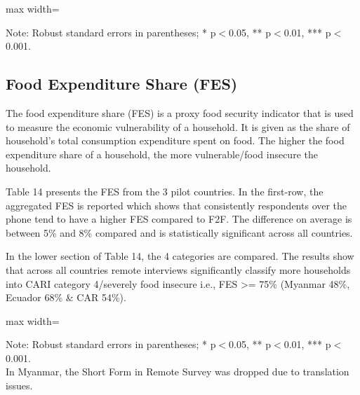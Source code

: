 \documentclass[11pt,harvard]{article}
\begin{document}
\begin{table}[htbp]
	\centering
	\begin{adjustbox}{max width=\textwidth}
		\begin{threeparttable}
			\caption{CAR: Each Coping Strategy Used}
			\scriptsize
			 
			\label{tab:LCS_Ind_Modality_CAR}
			\begin{tablenotes}
				\item Note: Robust standard errors in parentheses; * p$<$0.05, ** p$<$0.01, *** p$<$0.001. 
			\end{tablenotes}
		\end{threeparttable}
	\end{adjustbox}
\end{table}

\pagebreak

\subsection{Food Expenditure Share (FES)}

The food expenditure share (FES) is a proxy food security indicator that is used to measure the economic vulnerability of a household. It is given as the share of household's total consumption expenditure spent on food. The higher the food expenditure share of a household, the more vulnerable/food insecure the household.

Table 14 presents the FES from the 3 pilot countries. In the first-row, the aggregated FES is reported which shows that consistently respondents over the phone tend to have a higher FES compared to F2F. The difference on average is between 5\% and 8\% compared and is statistically significant across all countries. 

In the lower section of Table 14, the 4 categories are compared. The results show that across all countries remote interviews significantly classify more households into CARI category 4/severely food insecure i.e., FES >= 75\% (Myanmar 48\%, Ecuador 68\% \& CAR 54\%).

\begin{table}[htbp]
	\centering
	\begin{adjustbox}{max width=\textwidth}
		\begin{threeparttable}
			\caption{Impact of Survey Modality on Expenditure and Food Expenditure Share}
			\scriptsize
			 
			\label{tab:FES_Modality_All_Country}
			\begin{tablenotes}
				\item Note: Robust standard errors in parentheses; * p$<$0.05, ** p$<$0.01, *** p$<$0.001. \\ 
				In Myanmar, the Short Form in Remote Survey was dropped due to translation issues.
			\end{tablenotes}
		\end{threeparttable}
	\end{adjustbox}
\end{table}
\end{document}
